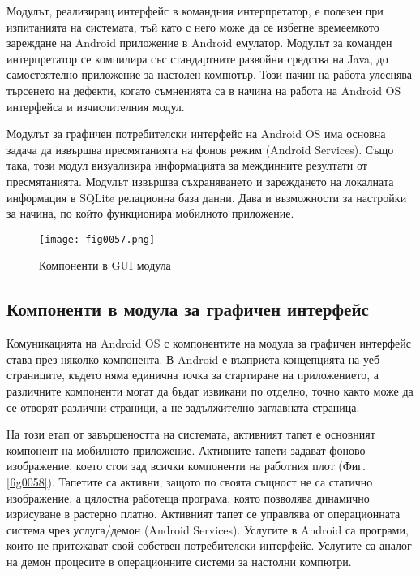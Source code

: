 Модулът, реализиращ интерфейс в командния интерпретатор, е полезен при изпитанията на системата, тъй като с него може да се избегне времеемкото зареждане на Android приложение в Android емулатор. Модулът за команден интерпретатор се компилира със стандартните развойни средства на Java, до самостоятелно приложение за настолен компютър. Този начин на работа улеснява търсенето на дефекти, когато съмненията са в начина на работа на Android OS интерфейса и изчислителния модул. 

Модулът за графичен потребителски интерфейс на Android OS има основна задача да извършва пресмятанията на фонов режим (Android Services). Също така, този модул визуализира информацията за междинните резултати от пресмятанията. Модулът извършва съхраняването и зареждането на локалната информация в SQLite релационна база данни. Дава и възможности за настройки за начина, по който функционира мобилното приложение.

\begin{figure}[H]
  \centering
  \texttt{[image: fig0057.png]}
  \caption{Компоненти в GUI модула}
\label{fig0057}
\end{figure}

\subsection{Компоненти в модула за графичен интерфейс}

Комуникацията на Android OS с компонентите на модула за графичен интерфейс става през няколко компонента. В Android е възприета концепцията на уеб страниците, където няма единична точка за стартиране на приложението, а различните компоненти могат да бъдат извикани по отделно, точно както може да се отворят различни страници, а не задължително заглавната страница. 

На този етап от завършеността на системата, активният тапет е основният компонент на мобилното приложение. Активните тапети задават фоново изображение, което стои зад всички компоненти на работния плот (Фиг. \ref{fig0058}). Тапетите са активни, защото по своята същност не са статично изображение, а цялостна работеща програма, която позволява динамично изрисуване в растерно платно. Активният тапет се управлява от операционната система чрез услуга/демон (Android Services). Услугите в Android са програми, които не притежават свой собствен потребителски интерфейс. Услугите са аналог на демон процесите в операционните системи за настолни компютри. 

